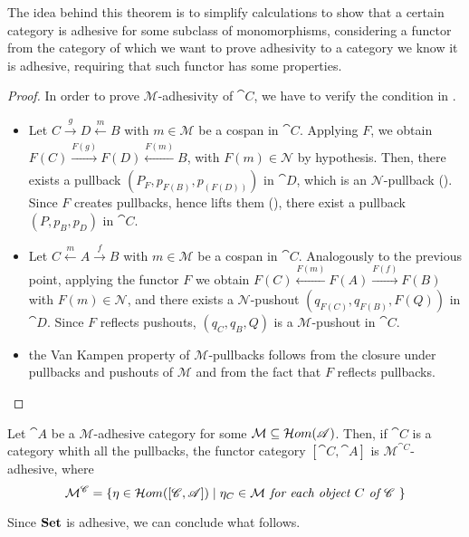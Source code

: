 The idea behind this theorem is to simplify calculations to show that a certain category is adhesive for some subclass of monomorphisms, considering a functor from the category of which we want to prove adhesivity to a category we know it is adhesive, requiring that such functor has some properties.

\begin{proof}
    In order to prove $\mathcal M$-adhesivity of $\cat C$, we have to verify the condition in .
    \begin{itemize}
        \item Let $C \xrightarrow[]{g} D \xleftarrow[]{m} B$ with $m \in \mathcal M$ be a cospan in $\cat C$. Applying $F$, we obtain $F(C) \xrightarrow[]{F(g)} F(D) \xleftarrow[]{F(m)} B$, with $F(m) \in \mathcal{N}$ by hypothesis. Then, there exists a pullback $(P_F, p_{F(B)}, p_{(F(D))})$ in $\cat D$, which is an $\mathcal N$-pullback (). Since $F$ creates pullbacks, hence lifts them (), there exist a pullback $(P, p_B, p_D)$ in $\cat C$.
        \item Let $C \xleftarrow{m} A \xrightarrow{f} B$ with $ m \in \mathcal M$ be a cospan in $\cat C$. Analogously to the previous point, applying the functor $F$ we obtain $F(C) \xleftarrow{F(m)} F(A) \xrightarrow{F(f)} F(B)$ with $ F(m) \in \mathcal N$, and there exists a $\mathcal N$-pushout $(q_{F(C)}, q_{F(B)}, F(Q))$ in $\cat D$. Since $F$ reflects pushouts, $(q_C, q_B, Q)$ is a $\mathcal{M}$-pushout in $\cat C$.
        \item the Van Kampen property of $\mathcal M$-pullbacks follows from the closure under pullbacks and pushouts of $\mathcal M$ and from the fact that $F$ reflects pullbacks.
    \end{itemize}
    
\end{proof}

\begin{cor}\label{cor:adhesivity_functor_categories}
    Let $\cat A$ be a $\mathcal M$-adhesive category for some $\mathcal M \subseteq \mathcal{H}om(\mathscr{A})$. Then, if $\cat C$ is a category whith all the pullbacks, the functor category $[\cat C, \cat A]$ is $\mathcal M^{\cat C}$-adhesive, where
    \[
        \mathcal{M}^{\mathscr{C}} = \{\eta \in \mathcal{H}om([\mathscr{C}, \mathscr{A}]) \mid \eta_C \in \mathcal M \textit{ for each object $C$ of $\mathscr{C}$ }\}
    \]
\end{cor}

Since $\mathbf{Set}$ is adhesive, we can conclude what follows.


